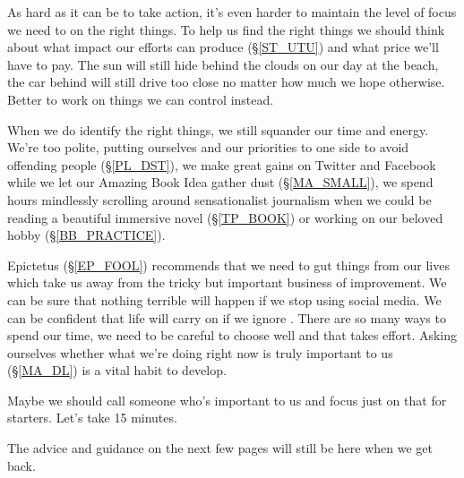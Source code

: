 \cleardoublepage
{\small

As hard as it can be to take action, it's even harder to maintain the level of focus we need to on the right things. To help us find the right things we should think about what impact our efforts can produce (\S \ref{ST_UTU}) and what price we'll have to pay. The sun will still hide behind the clouds on our day at the beach, the car behind will still drive too close no matter how much we hope otherwise. Better to work on things we can control instead.  %

When we do identify the right things, we still squander our time and energy. We're too polite, putting ourselves and our priorities to one side to avoid offending people (\S \ref{PL_DST}), we make great gains on Twitter and Facebook while we let our Amazing Book Idea gather dust (\S \ref{MA_SMALL}), we spend hours mindlessly scrolling around sensationalist journalism when we could be reading a beautiful immersive novel (\S \ref{TP_BOOK}) or working on our beloved hobby (\S \ref{BB_PRACTICE}). 

Epictetus (\S \ref{EP_FOOL}) recommends that we need to gut things from our lives which take us away from the tricky but important business of improvement. We can be sure that nothing terrible will happen if we stop using social media. We can be confident that life will carry on if we ignore . There are so many ways to spend our time, we need to be careful to choose well and that takes effort. Asking ourselves whether what we're doing right now is truly important to us (\S \ref{MA_DL}) is a vital habit to develop.

Maybe we should call someone who's important to us and focus just on that for starters. Let's take 15 minutes. 

The advice and guidance on the next few pages will still be here when we get back. 

}
